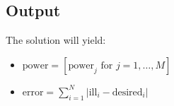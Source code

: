 \documentclass{article}
\begin{document}
\subsection*{Output}
The solution will yield:
\begin{itemize}
    \item \( \text{power} = [\text{power}_j \text{ for } j = 1, \ldots, M] \)
    \item \( \text{error} = \sum_{i=1}^{N} |\text{ill}_i - \text{desired}_i| \)
\end{itemize}
\end{document}
